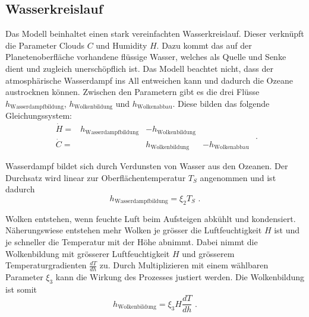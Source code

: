 \begin{refsection}
\subsection{Wasserkreislauf}
Das Modell beinhaltet einen stark vereinfachten Wasserkreislauf.
Dieser verknüpft die Parameter Clouds $C$ und Humidity $H$.
Dazu kommt das auf der Planetenoberfläche vorhandene flüssige Wasser, welches als Quelle und Senke dient und zugleich unerschöpflich ist. Das Modell beachtet nicht, dass der atmosphärische Wasserdampf ins All entweichen kann und dadurch die Ozeane austrocknen können. Zwischen den Parametern gibt es die drei Flüsse $h_{\text{Wasserdampfbildung}}$, $h_{\text{Wolkenbildung}}$ und $h_{\text{Wolkenabbau}}$. Diese bilden das folgende Gleichungssystem:
\begin{equation}
\begin{matrix}
\dot{H}   = & h_{\text{Wasserdampfbildung}} & - h_{\text{Wolkenbildung}}   &                      \\
\dot{C}   = &                     		    &   h_{\text{Wolkenbildung}}   & - h_{\text{Wolkenabbau}}
\end{matrix} \text{ .}
\end{equation}

Wasserdampf bildet sich durch Verdunsten von Wasser aus den Ozeanen. Der Durchsatz wird linear zur Oberflächentemperatur $T_S$ angenommen und ist dadurch
\begin{equation}
h_{\text{Wasserdampfbildung}} = \xi_2 T_S \text{ .}
\end{equation}


Wolken entstehen, wenn feuchte Luft beim Aufsteigen abkühlt und kondensiert. Näherungswiese entstehen mehr Wolken je grösser die Luftfeuchtigkeit $H$ ist und je schneller die Temperatur mit der Höhe abnimmt.
Dabei nimmt die Wolkenbildung mit grösserer Luftfeuchtigkeit $H$ und grösserem Temperaturgradienten $\frac{dT}{dh}$ zu. Durch Multiplizieren mit einem wählbaren Parameter $\xi_3$ kann die Wirkung des Prozesses justiert werden. Die Wolkenbildung ist somit
\begin{equation}
h_{\text{Wolkenbildung}} = \xi_3 H \frac{dT}{dh} \text{ .}
\end{equation}


\end{refsection}

